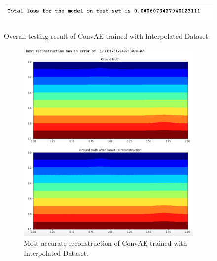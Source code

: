 \begin{figure}[H]
    \caption{Overall testing result of ConvAE trained with Interpolated Dataset.}
    \includegraphics[scale=0.8]{figures/mantle_convection_images/larger_dataset_interpolated/ConvAE_OverallTesting.png}
    \label{figure:ConvAE_interpolated_testing}
\end{figure}

\begin{figure}[H]
\centering
\begin{subfigure}{0.45\textwidth}
    \includegraphics[width=\textwidth]{figures/mantle_convection_images/larger_dataset_interpolated/ConvAE_Best.png}
    \caption{Most accurate reconstruction of ConvAE trained with Interpolated Dataset.}
\end{subfigure}
\hfill
\begin{subfigure}{0.45\textwidth}

\end{subfigure}
\end{figure}
